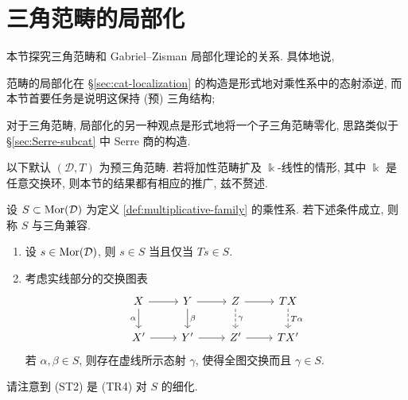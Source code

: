 \section{三角范畴的局部化}\label{sec:triangulated-localization}
本节探究三角范畴和 Gabriel--Zisman 局部化理论的关系. 具体地说,
\begin{compactitem}
	\item 范畴的局部化在 \S\ref{sec:cat-localization} 的构造是形式地对乘性系中的态射添逆, 而本节首要任务是说明这保持 (预) 三角结构;
	\item 对于三角范畴, 局部化的另一种观点是形式地将一个子三角范畴零化, 思路类似于 \S\ref{sec:Serre-subcat} 中 Serre 商的构造.
\end{compactitem}

以下默认 $(\mathcal{D}, T)$ 为预三角范畴. 若将加性范畴扩及 $\Bbbk$-线性的情形, 其中 $\Bbbk$ 是任意交换环, 则本节的结果都有相应的推广, 兹不赘述.

\begin{definition}
	设 $S \subset \operatorname{Mor}(\mathcal{D})$ 为定义 \ref{def:multiplicative-family} 的乘性系. 若下述条件成立, 则称 $S$ 与三角兼容.
	\begin{enumerate}[(ST1)]
		\item 设 $s \in \operatorname{Mor}(\mathcal{D})$, 则 $s \in S$ 当且仅当 $Ts \in S$.
		\item 考虑实线部分的交换图表
		\[\begin{tikzcd}
			X \arrow[d, "\alpha"'] \arrow[r] & Y \arrow[d, "\beta"] \arrow[r] & Z \arrow[dashed, d, "\gamma"] \arrow[r] & TX \arrow[dashed, d, "T\alpha"] \\
			X' \arrow[r] & Y' \arrow[r] & Z' \arrow[r] & TX'
		\end{tikzcd}\]
		若 $\alpha, \beta \in S$, 则存在虚线所示态射 $\gamma$, 使得全图交换而且 $\gamma \in S$.
	\end{enumerate}
\end{definition}

请注意到 (ST2) 是 (TR4) 对 $S$ 的细化.

